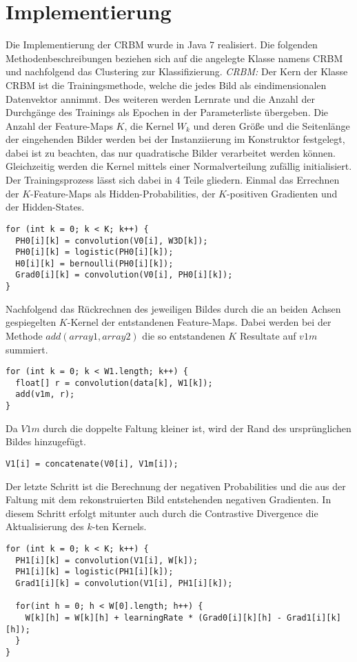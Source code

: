 \section{Implementierung}\label{implementation}
Die Implementierung der CRBM wurde in Java 7 realisiert.
Die folgenden Methodenbeschreibungen beziehen sich auf die angelegte Klasse namens CRBM und nachfolgend das Clustering zur Klassifizierung.
\textit{CRBM:}
Der Kern der Klasse CRBM ist die Trainingsmethode, welche die jedes Bild als eindimensionalen Datenvektor annimmt. Des weiteren werden Lernrate und die Anzahl der Durchgänge des Trainings als Epochen in der Parameterliste übergeben.
Die Anzahl der Feature-Maps $K$, die Kernel $W_k$ und deren Größe und die Seitenlänge der eingehenden Bilder werden bei der Instanziierung im Konstruktor festgelegt, dabei ist zu beachten, das nur quadratische Bilder verarbeitet werden können. Gleichzeitig werden die Kernel mittels einer Normalverteilung zufällig initialisiert.
Der Trainingsprozess lässt sich dabei in 4 Teile gliedern. Einmal das Errechnen der $K$-Feature-Maps als Hidden-Probabilities, der $K$-positiven Gradienten und der Hidden-States.
\begin{lstlisting}
for (int k = 0; k < K; k++) {
  PH0[i][k] = convolution(V0[i], W3D[k]);
  PH0[i][k] = logistic(PH0[i][k]);
  H0[i][k] = bernoulli(PH0[i][k]);
  Grad0[i][k] = convolution(V0[i], PH0[i][k]);
}
\end{lstlisting}
Nachfolgend das Rückrechnen des jeweiligen Bildes durch die an beiden Achsen gespiegelten $K$-Kernel der entstandenen Feature-Maps. 
Dabei werden bei der Methode $add(array1, array2)$ die so entstandenen $K$ Resultate auf $v1m$ summiert.
\begin{lstlisting}
for (int k = 0; k < W1.length; k++) {
  float[] r = convolution(data[k], W1[k]);
  add(v1m, r);
}
\end{lstlisting}
Da $V1m$ durch die doppelte Faltung kleiner ist, wird der Rand des ursprünglichen Bildes hinzugefügt.
\begin{lstlisting}
V1[i] = concatenate(V0[i], V1m[i]);
\end{lstlisting}
Der letzte Schritt ist die Berechnung der negativen Probabilities und die aus der Faltung mit dem rekonstruierten Bild entstehenden negativen Gradienten. 
In diesem Schritt erfolgt mitunter auch durch die Contrastive Divergence die Aktualisierung des $k$-ten Kernels.
\begin{lstlisting}
for (int k = 0; k < K; k++) {
  PH1[i][k] = convolution(V1[i], W[k]);
  PH1[i][k] = logistic(PH1[i][k]);
  Grad1[i][k] = convolution(V1[i], PH1[i][k]);

  for(int h = 0; h < W[0].length; h++) {
    W[k][h] = W[k][h] + learningRate * (Grad0[i][k][h] - Grad1[i][k][h]);
  }
}
\end{lstlisting}


